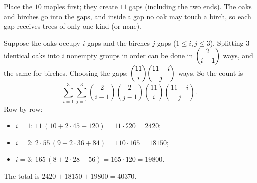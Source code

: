 Place the $10$ maples first; they create $11$ gaps (including the two ends). The oaks and birches go into the gaps, and inside a gap no oak may touch a birch, so each gap receives trees of only one kind (or none).

Suppose the oaks occupy $i$ gaps and the birches $j$ gaps ($1\le i,j\le3$). Splitting $3$ identical oaks into $i$ nonempty groups in order can be done in $\dbinom{2}{i-1}$ ways, and the same for birches. Choosing the gaps: $\dbinom{11}{i}\dbinom{11-i}{j}$ ways. So the count is
\[
\sum_{i=1}^{3}\sum_{j=1}^{3}\binom{2}{i-1}\binom{2}{j-1}\binom{11}{i}\binom{11-i}{j}.
\]
Row by row:
\begin{itemize}
\item $i=1$: $11\,(10+2\cdot45+120)=11\cdot220=2420$;
\item $i=2$: $2\cdot55\,(9+2\cdot36+84)=110\cdot165=18150$;
\item $i=3$: $165\,(8+2\cdot28+56)=165\cdot120=19800$.
\end{itemize}
The total is $2420+18150+19800=\boxed{40370}$.
